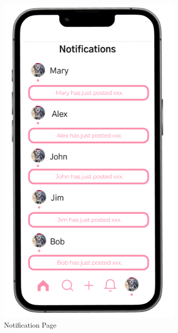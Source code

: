 \begin{figure}[!htbp]
\begin{subfigure}[b]{0.3\textwidth}
    \includegraphics[width=\textwidth]{Figures/notification.png}
    \caption{Notification Page}
    \label{fig:notification}
  \end{subfigure}
  \hfill
  \begin{subfigure}[b]{0.3\textwidth}

\end{subfigure}
\end{figure}
